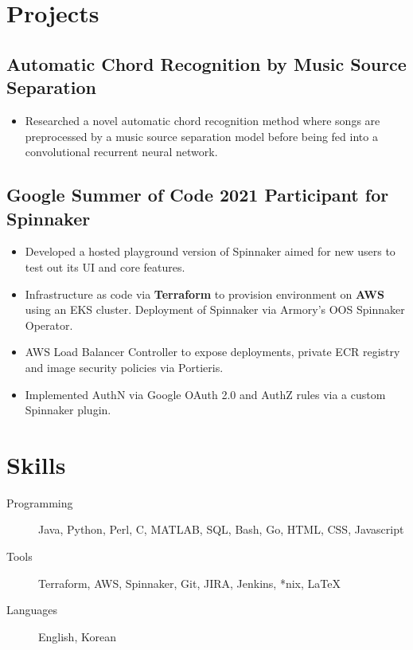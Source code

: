 \documentclass{mycv}
\begin{document}
\section{Projects}

%
\subsection{Automatic Chord Recognition by Music Source Separation
 \href{https://ko28.github.io/chord-transcription/}{
}
}
\begin{itemize}
  \item {
    Researched a novel automatic chord recognition method where songs are preprocessed by a music source separation model before being fed into a convolutional recurrent neural network. 
  }
\iffalse
\item{
Experiments have showed that the model trained with song computed from music source separation performed worse on average compared to a model trained on the original dataset.
}
\fi 
 \end{itemize}


\subsection{Google Summer of Code 2021 Participant for Spinnaker\
    \href{https://github.com/spinnaker/try.spinnaker.io}{}
}
\begin{itemize}
  \item {
    Developed a hosted playground version of Spinnaker aimed for new users to test out its UI and core features.
  }
 \item{
 Infrastructure as code via \textbf{Terraform} to provision environment on \textbf{AWS} using an EKS cluster. Deployment of Spinnaker via Armory's OOS Spinnaker Operator.
 }
 \item{
 AWS Load Balancer Controller to expose deployments, private ECR registry and image security policies via Portieris. 
}
\item{
    Implemented AuthN via Google OAuth 2.0 and AuthZ rules via a custom Spinnaker plugin.
}
 \end{itemize}
\section{Skills}
\begin{description}
  \item[Programming] Java, Python, Perl, C, MATLAB, SQL, Bash, Go, HTML, CSS, Javascript
  \item[Tools] Terraform, AWS, Spinnaker, Git, JIRA, Jenkins, *nix, \LaTeX 
  \item[Languages] English, Korean
\end{description}
\iffalse
\end{document}
